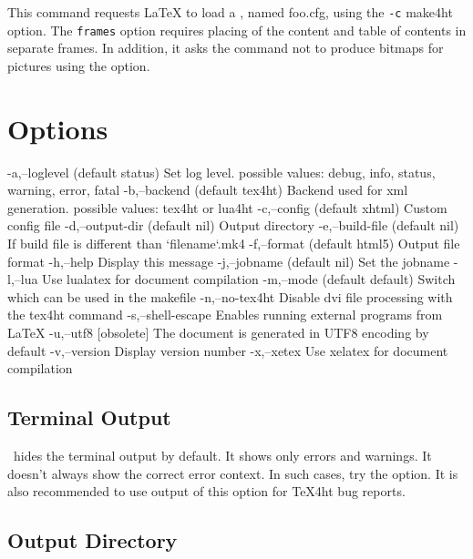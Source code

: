 This command requests LaTeX to load a , named
foo.cfg, using the \texttt{-c} make4ht option. The \texttt{frames} option
requires placing of the content and table of contents in separate frames. In
addition, it asks the  command not to produce bitmaps for pictures using the  option.

\section{\makefourht{} Options}


\begin{shellcommand}
-a,--loglevel (default status) Set log level.
possible values: debug, info, status, warning, error, fatal
-b,--backend (default tex4ht) Backend used for xml generation. 
possible values: tex4ht or lua4ht
-c,--config (default xhtml) Custom config file
-d,--output-dir (default nil)  Output directory
-e,--build-file (default nil)  If build file is different than `filename`.mk4
-f,--format  (default html5)  Output file format
-h,--help  Display this message
-j,--jobname (default nil)  Set the jobname
-l,--lua  Use lualatex for document compilation
-m,--mode (default default) Switch which can be used in the makefile 
-n,--no-tex4ht Disable dvi file processing with the tex4ht command
-s,--shell-escape Enables running external programs from LaTeX
-u,--utf8  [obsolete] The document is generated in UTF8 encoding by default
-v,--version  Display version number
-x,--xetex Use xelatex for document compilation
\end{shellcommand}

\subsection{Terminal Output}

\makefourht\ hides the terminal output by default. It shows only errors and warnings.
It doesn't always show the correct error context. In such cases, try the  option.
It is also recommended to use output of this option for \TeX4ht bug reports.


\subsection{Output Directory}

